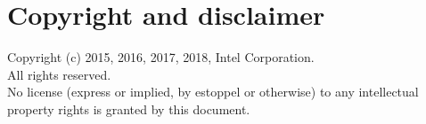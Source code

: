 \documentclass[11pt]{article}
\begin{document}
\section{Copyright and disclaimer}
Copyright (c) 2015, 2016, 2017, 2018, Intel Corporation.
\\
All rights reserved.
\\
No license (express or implied, by estoppel or otherwise) to any
intellectual property rights is granted by this document.

%
%
%
\end{document}
